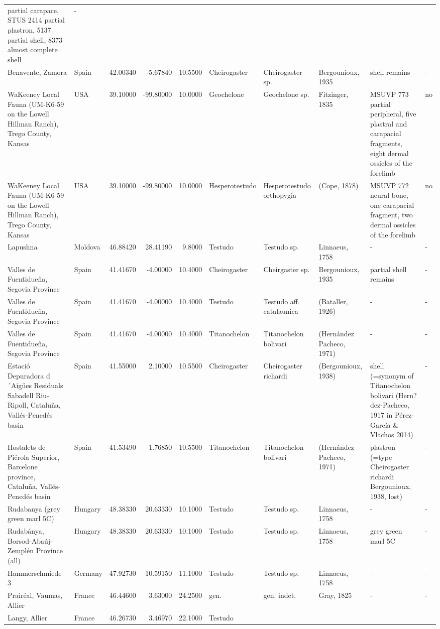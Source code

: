 \documentclass[]{article}
\begin{document}
\begin{longtable}[]{@{}llrrrlllll@{}}
partial carapace, STUS 2414 partial plastron, 5137 partial shell, 8373
almost complete shell & -\tabularnewline
Benavente, Zamora & Spain & 42.00340 & -5.67840 & 10.5500 & Cheirogaster
& Cheirogaster sp. & Bergounioux, 1935 & shell remains &
-\tabularnewline
WaKeeney Local Fauna (UM-K6-59 on the Lowell Hillman Ranch), Trego
County, Kansas & USA & 39.10000 & -99.80000 & 10.0000 & Geochelone &
Geochelone sp. & Fitzinger, 1835 & MSUVP 773 partial peripheral, five
plastral and carapacial fragments, eight dermal ossicles of the forelimb
& no\tabularnewline
WaKeeney Local Fauna (UM-K6-59 on the Lowell Hillman Ranch), Trego
County, Kansas & USA & 39.10000 & -99.80000 & 10.0000 & Hesperotestudo &
Hesperotestudo orthopygia & (Cope, 1878) & MSUVP 772 neural bone, one
carapacial fragment, two dermal ossicles of the forelimb &
no\tabularnewline
Lapushna & Moldova & 46.88420 & 28.41190 & 9.8000 & Testudo & Testudo
sp. & Linnaeus, 1758 & - & -\tabularnewline
Valles de Fuentidueña, Segovia Province & Spain & 41.41670 & -4.00000 &
10.4000 & Cheirogaster & Cheirgaster sp. & Bergounioux, 1935 & partial
shell remains & -\tabularnewline
Valles de Fuentidueña, Segovia Province & Spain & 41.41670 & -4.00000 &
10.4000 & Testudo & Testudo aff. catalaunica & (Bataller, 1926) & - &
-\tabularnewline
Valles de Fuentidueña, Segovia Province & Spain & 41.41670 & -4.00000 &
10.4000 & Titanochelon & Titanochelon bolivari & (Hernández Pacheco,
1971) & - & -\tabularnewline
Estació Depuradora d´Aigües Residuals Sabadell Riu-Ripoll, Cataluña,
Vallés-Penedés basin & Spain & 41.55000 & 2.10000 & 10.5500 &
Cheirogaster & Cheirogaster richardi & (Bergounioux, 1938) & shell
(=synonym of Titanochelon bolivari (Hern?dez-Pacheco, 1917 in
Pérez-García \& Vlachos 2014) & -\tabularnewline
Hostalets de Piérola Superior, Barcelone province, Cataluña,
Vallés-Penedés basin & Spain & 41.53490 & 1.76850 & 10.5500 &
Titanochelon & Titanochelon bolivari & (Hernández Pacheco, 1971) &
plastron (=type Cheirogaster richardi Bergounioux, 1938, lost) &
-\tabularnewline
Rudabanya (grey green marl 5C) & Hungary & 48.38330 & 20.63330 & 10.1000
& Testudo & Testudo sp. & Linnaeus, 1758 & - & -\tabularnewline
Rudabánya, Borsod-Abaúj-Zemplén Province (all) & Hungary & 48.38330 &
20.63330 & 10.1000 & Testudo & Testudo sp. & Linnaeus, 1758 & grey green
marl 5C & -\tabularnewline
Hammerschmiede 3 & Germany & 47.92730 & 10.59150 & 11.1000 & Testudo &
Testudo sp. & Linnaeus, 1758 & - & -\tabularnewline
Prairéal, Vaumas, Allier & France & 46.44600 & 3.63000 & 24.2500 & gen.
& gen. indet. & Gray, 1825 & - & -\tabularnewline
Langy, Allier & France & 46.26730 & 3.46970 & 22.1000 & Testudo &

\end{longtable}
\end{document}
